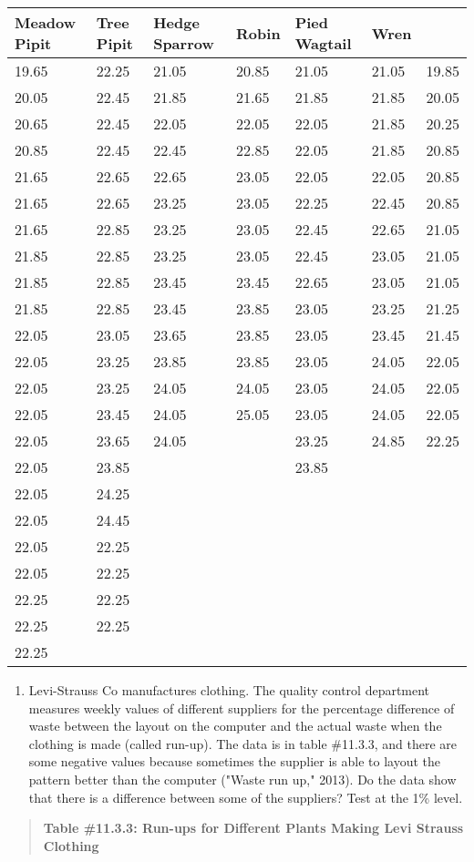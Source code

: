 \documentclass[]{book}
\providecommand{\tightlist}{%
  \setlength{\itemsep}{0pt}\setlength{\parskip}{0pt}}
\begin{document}
\begin{longtable}[]{@{}lllllll@{}}
\toprule
Meadow Pipit & Tree Pipit & Hedge Sparrow & Robin & Pied Wagtail & Wren &\tabularnewline
\midrule
\endhead
19.65 & 22.25 & 21.05 & 20.85 & 21.05 & 21.05 & 19.85\tabularnewline
20.05 & 22.45 & 21.85 & 21.65 & 21.85 & 21.85 & 20.05\tabularnewline
20.65 & 22.45 & 22.05 & 22.05 & 22.05 & 21.85 & 20.25\tabularnewline
20.85 & 22.45 & 22.45 & 22.85 & 22.05 & 21.85 & 20.85\tabularnewline
21.65 & 22.65 & 22.65 & 23.05 & 22.05 & 22.05 & 20.85\tabularnewline
21.65 & 22.65 & 23.25 & 23.05 & 22.25 & 22.45 & 20.85\tabularnewline
21.65 & 22.85 & 23.25 & 23.05 & 22.45 & 22.65 & 21.05\tabularnewline
21.85 & 22.85 & 23.25 & 23.05 & 22.45 & 23.05 & 21.05\tabularnewline
21.85 & 22.85 & 23.45 & 23.45 & 22.65 & 23.05 & 21.05\tabularnewline
21.85 & 22.85 & 23.45 & 23.85 & 23.05 & 23.25 & 21.25\tabularnewline
22.05 & 23.05 & 23.65 & 23.85 & 23.05 & 23.45 & 21.45\tabularnewline
22.05 & 23.25 & 23.85 & 23.85 & 23.05 & 24.05 & 22.05\tabularnewline
22.05 & 23.25 & 24.05 & 24.05 & 23.05 & 24.05 & 22.05\tabularnewline
22.05 & 23.45 & 24.05 & 25.05 & 23.05 & 24.05 & 22.05\tabularnewline
22.05 & 23.65 & 24.05 & & 23.25 & 24.85 & 22.25\tabularnewline
22.05 & 23.85 & & & 23.85 & &\tabularnewline
22.05 & 24.25 & & & & &\tabularnewline
22.05 & 24.45 & & & & &\tabularnewline
22.05 & 22.25 & & & & &\tabularnewline
22.05 & 22.25 & & & & &\tabularnewline
22.25 & 22.25 & & & & &\tabularnewline
22.25 & 22.25 & & & & &\tabularnewline
22.25 & & & & & &\tabularnewline
\bottomrule
\end{longtable}

\begin{enumerate}
\def\labelenumi{\arabic{enumi}.}
\setcounter{enumi}{1}
\tightlist
\item
  Levi-Strauss Co manufactures clothing. The quality control department measures weekly values of different suppliers for the percentage difference of waste between the layout on the computer and the actual waste when the clothing is made (called run-up). The data is in table \#11.3.3, and there are some negative values because sometimes the supplier is able to layout the pattern better than the computer ("Waste run up," 2013). Do the data show that there is a difference between some of the suppliers? Test at the 1\% level.
\end{enumerate}

\begin{quote}
\textbf{Table \#11.3.3: Run-ups for Different Plants Making Levi Strauss
Clothing}
\end{quote}
\end{document}
